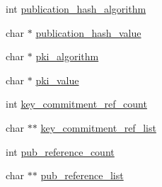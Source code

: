 \begin{DoxyCompactItemize}
\item 
int \hyperlink{struct_g_t_time_stamp_explicit__st_a78953758fec49c15de4271239daf6c69}{publication\_\-hash\_\-algorithm}
\item 
char $\ast$ \hyperlink{struct_g_t_time_stamp_explicit__st_a9a6d8447d20ec6f54760d3e9f5653f5a}{publication\_\-hash\_\-value}
\item 
char $\ast$ \hyperlink{struct_g_t_time_stamp_explicit__st_af86dc359e2203e253f648aeee1062369}{pki\_\-algorithm}
\item 
char $\ast$ \hyperlink{struct_g_t_time_stamp_explicit__st_a1e93bf6f28e889bb41c1f62baa2da10a}{pki\_\-value}
\item 
int \hyperlink{struct_g_t_time_stamp_explicit__st_a524b118c600484b08ab9cf92f0ea3130}{key\_\-commitment\_\-ref\_\-count}
\item 
char $\ast$$\ast$ \hyperlink{struct_g_t_time_stamp_explicit__st_a5a275a4d0863f94b657206d3ba148793}{key\_\-commitment\_\-ref\_\-list}
\item 
int \hyperlink{struct_g_t_time_stamp_explicit__st_a3906ff3ffd36ebce3243b55c3fe46083}{pub\_\-reference\_\-count}
\item 
char $\ast$$\ast$ \hyperlink{struct_g_t_time_stamp_explicit__st_a0fadfc61f93275238ab793485e4278be}{pub\_\-reference\_\-list}
\end{DoxyCompactItemize}


